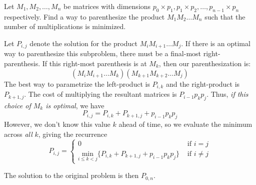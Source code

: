\begin{exercise}{}{}
    Let $M_1, M_2, \hdots, M_n$ be matrices with dimensions $p_0\times p_1, p_1\times p_2, \hdots, p_{n-1}\times p_n$ respectively. Find a way to parenthesize the product $M_1M_2\hdots M_n$ such that the number of multiplications is minimized.
\end{exercise}

\begin{solution}
    Let $P_{i,j}$ denote the solution for the product $M_iM_{i+1}\hdots M_j$. If there is an optimal way to parenthesize this subproblem, there must be a final-most right-parenthesis. If this right-most parenthesis is at $M_k$, then our parenthesization is: \[\left(M_iM_{i+1}\hdots M_k\right)\left(M_{k+1}M_{k+2}\hdots M_j\right)\] The best way to parametrize the left-product is $P_{i,k}$ and the right-product is $P_{k+1,j}$. The cost of multiplying the resultant matrices is $P_{i-1}p_kp_j$. Thus, \textit{if this choice of $M_k$ is optimal}, we have \[P_{i,j}=P_{i,k}+P_{k+1,j}+p_{i-1}p_kp_j\] However, we don't know this value $k$ ahead of time, so we evaluate the minimum across \textit{all} $k$, giving the recurrence
    \[P_{i,j} = \begin{cases}
            0                                                                   & \text{ if }i=j     \\
            \underset{i\leq k<j}{\text{min}}\{P_{i,k}+P_{k+1,j}+p_{i-1}p_kp_j\} & \text{ if }i\neq j
        \end{cases}\]

    The solution to the original problem is then $P_{0,n}$.
\end{solution}